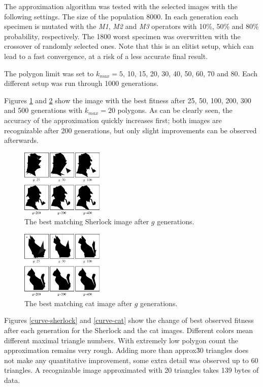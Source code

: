 \documentclass[conference]{IEEEtran}
\begin{document}
The approximation algorithm was tested with the selected
images with the following settings. The size of the population
8000. In each generation each specimen is mutated with the
\emph{M1}, \emph{M2} and \emph{M3} operators with 10\%, 50\%
and 80\% probability, respectively. The 1800 worst specimen
was overwritten with the crossover of randomly selected ones.
Note that this is an elitist setup, which can lead to a fast
convergence, at a risk of a less accurate final result.

The polygon limit was set to $k_{max}=5$, 10, 15, 20, 30, 40, 50,
60, 70 and 80. Each different setup was run through 1000 generations.

Figures \ref{sherlock-6} and \ref{cat-6} show the image with
the best fitness after 25, 50, 100, 200, 300 and 500 generations
with $k_{max}=20$ polygons. As can be clearly seen, the
accuracy of the approximation quickly increases first; both
images are recognizable after 200 generations, but only slight
improvements can be observed afterwards.

\begin{figure}[htbp]
	\centering
	\includegraphics[width=0.35\textwidth]{fig/sherlock6.png}
	\caption{The best matching Sherlock image after $g$ generations.}
	\label{sherlock-6}
\end{figure}

\begin{figure}[htbp]
	\centering
	\includegraphics[width=0.35\textwidth]{fig/cat6.png}
	\caption{The best matching cat image after $g$ generations.}
	\label{cat-6}
\end{figure}

Figures \ref{curve-sherlock} and \ref{curve-cat} show the change
of best observed fitness after each generation for the Sherlock
and the cat images. Different colors mean different maximal
triangle numbers. With extremely low polygon count the approximation
remains very rough. Adding more than approx\. 30 triangles
does not make any quantitative improvement, some extra detail
was observed up to 60 triangles. A recognizable image approximated
with 20 triangles takes 139 bytes of data.
\end{document}

